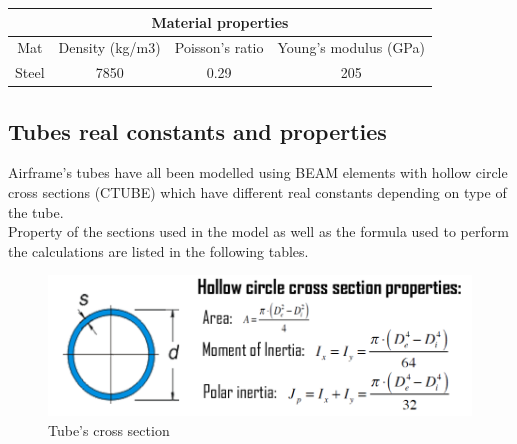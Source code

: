 \medskip
\begin{table}[h!]
	\centering
	
	\begin{tabular}{c c c c} 
		\toprule
		\multicolumn{4}{c}{Material properties}\\
		\midrule
		Mat & Density (kg/m3) & Poisson's ratio & Young's modulus (GPa) \\
		\midrule
		Steel & 7850  &  0.29 & 205 \\ 
		\bottomrule
	\end{tabular}	
\end{table}


\clearpage
\subsection*{Tubes real constants and properties}

\noindent
Airframe's tubes have all been modelled using BEAM elements with hollow circle cross sections (CTUBE) which have different real constants depending on type of the tube. \\ Property of the sections used in the model as well as the formula used to perform the calculations are listed in the following tables. 

\bigskip
\begin{figure}[h]
	\begin{center}
		\centering  		 		
		\includegraphics[width=0.9\linewidth]{PICTURES/2_Lama_truss/PNG/tube1.png}
	\end{center}
	\caption {Tube's cross section}
\end{figure}


